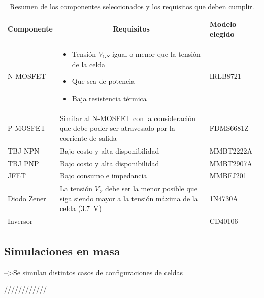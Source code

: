 \begin{table}[H]
\centering
\begin{tabular}{>{\centering\arraybackslash}m{2.8cm} m{8cm} >{\centering\arraybackslash}m{3.2cm}}
\hline
\textbf{Componente} & \multicolumn{1}{c}{\textbf{Requisitos}} & \textbf{Modelo elegido} \\ \hline
N-MOSFET    & \vspace{4pt}\begin{itemize}[leftmargin=*, nosep]
                \item Tensión $V_{GS}$ igual o menor que la tensión de la celda
                \item Que sea de potencia
                \item Baja resistencia térmica
            \end{itemize} & IRLB8721   \\ \hline
P-MOSFET    & Similar al N-MOSFET con la consideración que debe poder ser atravesado por la corriente de salida & FDMS6681Z  \\ \hline
TBJ NPN     & Bajo costo y alta disponibilidad & MMBT2222A  \\ \hline
TBJ PNP     & Bajo costo y alta disponibilidad & MMBT2907A  \\ \hline
JFET        & Bajo consumo e impedancia & MMBFJ201   \\ \hline
Diodo Zener & La tensión $V_Z$ debe ser la menor posible que siga siendo mayor a la tensión máxima de la celda (\SI{3.7}{\volt}) & 1N4730A    \\ \hline
Inversor    &   \multicolumn{1}{c}{-}    & CD40106    \\ \hline
\end{tabular}
\label{tab:componentes}
\caption{Resumen de los componentes seleccionados y los requisitos que deben cumplir.}
\end{table}

\subsection{Simulaciones en masa}

-->Se simulan distintos casos de configuraciones de celdas 





////////////

